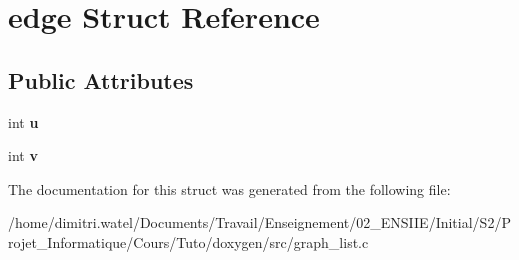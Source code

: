 \hypertarget{structedge}{}\section{edge Struct Reference}
\label{structedge}
\subsection*{Public Attributes}
\begin{DoxyCompactItemize}
\item 
\mbox{\label{structedge_a9169c2521e20f8e0f266e7cd8e38d279}} 
int {\bfseries u}
\item 
\mbox{\label{structedge_a149de160a4ee12cd3c57aab76abc0370}} 
int {\bfseries v}
\end{DoxyCompactItemize}


The documentation for this struct was generated from the following file\+:\begin{DoxyCompactItemize}
\item 
/home/dimitri.\+watel/\+Documents/\+Travail/\+Enseignement/02\+\_\+\+E\+N\+S\+I\+I\+E/\+Initial/\+S2/\+Projet\+\_\+\+Informatique/\+Cours/\+Tuto/doxygen/src/graph\+\_\+list.\+c\end{DoxyCompactItemize}
